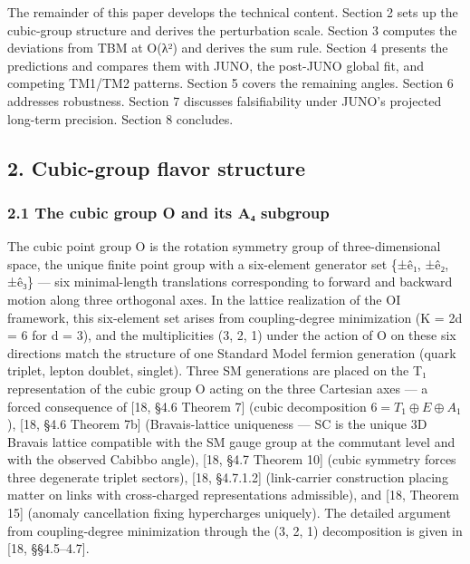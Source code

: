 \documentclass[
  11pt,
  letterpaper,
]{article}
\begin{document}
The remainder of this paper develops the technical content. Section 2
sets up the cubic-group structure and derives the perturbation scale.
Section 3 computes the deviations from TBM at O(λ²) and derives the sum
rule. Section 4 presents the predictions and compares them with JUNO,
the post-JUNO global fit, and competing TM1/TM2 patterns. Section 5
covers the remaining angles. Section 6 addresses robustness. Section 7
discusses falsifiability under JUNO's projected long-term precision.
Section 8 concludes.

\hypertarget{cubic-group-flavor-structure}{%
\subsection{2. Cubic-group flavor
structure}\label{cubic-group-flavor-structure}}

\hypertarget{the-cubic-group-o-and-its-aux2084-subgroup}{%
\subsubsection{2.1 The cubic group O and its A₄
subgroup}\label{the-cubic-group-o-and-its-aux2084-subgroup}}

The cubic point group O is the rotation symmetry group of
three-dimensional space, the unique finite point group with a
six-element generator set \{±ê₁, ±ê₂, ±ê₃\} --- six minimal-length
translations corresponding to forward and backward motion along three
orthogonal axes. In the lattice realization of the OI framework, this
six-element set arises from coupling-degree minimization (K = 2d = 6 for
d = 3), and the multiplicities (3, 2, 1) under the action of O on these
six directions match the structure of one Standard Model fermion
generation (quark triplet, lepton doublet, singlet). Three SM
generations are placed on the T₁ representation of the cubic group O
acting on the three Cartesian axes --- a forced consequence of {[}18,
§4.6 Theorem 7{]} (cubic decomposition \(6 = T_1 \oplus E \oplus A_1\)),
{[}18, §4.6 Theorem 7b{]} (Bravais-lattice uniqueness --- SC is the
unique 3D Bravais lattice compatible with the SM gauge group at the
commutant level and with the observed Cabibbo angle), {[}18, §4.7
Theorem 10{]} (cubic symmetry forces three degenerate triplet sectors),
{[}18, §4.7.1.2{]} (link-carrier construction placing matter on links
with cross-charged representations admissible), and {[}18, Theorem 15{]}
(anomaly cancellation fixing hypercharges uniquely). The detailed
argument from coupling-degree minimization through the (3, 2, 1)
decomposition is given in {[}18, §§4.5--4.7{]}.
\end{document}
